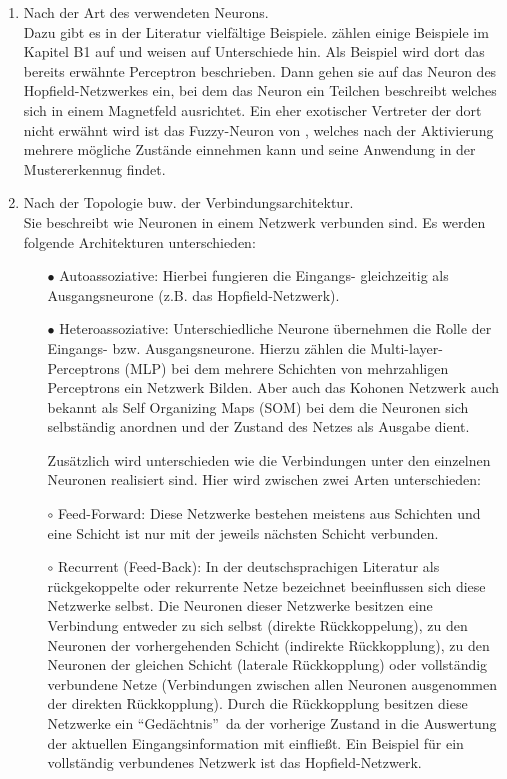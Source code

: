 \begin{enumerate}
\item%
Nach der Art des verwendeten Neurons.\\
Dazu gibt es in der Literatur vielfältige Beispiele. \citet{Fiesler96} zählen einige Beispiele im Kapitel B1 auf und weisen auf Unterschiede hin. Als Beispiel wird dort das bereits erwähnte Perceptron beschrieben. Dann gehen sie auf das Neuron des Hopfield-Netzwerkes ein, bei dem das Neuron ein Teilchen beschreibt welches sich in einem Magnetfeld ausrichtet. Ein eher exotischer Vertreter der dort nicht erwähnt wird ist das Fuzzy-Neuron von \citet{fuzzy-neuron}, welches nach der Aktivierung mehrere mögliche Zustände einnehmen kann und seine Anwendung in der Mustererkennug findet.

\item%
Nach der Topologie buw. der Verbindungsarchitektur.\\
Sie beschreibt wie Neuronen in einem Netzwerk verbunden sind.
Es werden folgende Architekturen unterschieden:
\begin{itemize}
\item[\textbf{$\bullet$}]%
Autoassoziative: Hierbei fungieren die Eingangs- gleichzeitig als Ausgangsneurone (z.B. das Hopfield-Netzwerk). 

\item[\textbf{$\bullet$}]%
Heteroassoziative: Unterschiedliche Neurone übernehmen die Rolle der Eingangs- bzw. Ausgangsneurone. Hierzu zählen die Multi-layer-Perceptrons (MLP) bei dem mehrere Schichten von mehrzahligen Perceptrons ein Netzwerk Bilden. Aber auch das Kohonen Netzwerk auch bekannt als Self Organizing Maps (SOM) bei dem die Neuronen sich selbständig anordnen und der Zustand des Netzes als Ausgabe dient.

Zusätzlich wird unterschieden wie die Verbindungen unter den einzelnen Neuronen realisiert sind. Hier wird zwischen zwei Arten unterschieden:

\item[$\circ$]%
Feed-Forward: Diese Netzwerke bestehen meistens aus Schichten und eine Schicht ist nur mit der jeweils nächsten Schicht verbunden.

\item[$\circ$]%
Recurrent (Feed-Back): In der deutschsprachigen Literatur als rückgekoppelte oder rekurrente Netze bezeichnet beeinflussen sich diese Netzwerke selbst. Die Neuronen dieser Netzwerke besitzen eine Verbindung entweder zu sich selbst (direkte Rückkoppelung), zu den Neuronen der vorhergehenden Schicht (indirekte Rückkopplung), zu den Neuronen der gleichen Schicht (laterale Rückkopplung) oder vollständig verbundene Netze (Verbindungen zwischen allen Neuronen ausgenommen der direkten Rückkopplung). Durch die Rückkopplung besitzen diese Netzwerke ein ``Gedächtnis''~da der vorherige Zustand in die Auswertung der aktuellen Eingangsinformation mit einfließt. Ein Beispiel für ein vollständig verbundenes Netzwerk ist das Hopfield-Netzwerk.


\end{itemize}
\end{enumerate}
